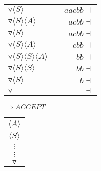 \documentclass[a4paper,12pt]{article}
\newcommand{\nonterminal}[1]{\langle #1 \rangle}
\begin{document}
\begin{tabular}{lcr}
$\triangledown \nonterminal{S}$	&	\hspace{10mm}	&	$aacbb\dashv$	\\
$\triangledown \nonterminal{S} \nonterminal{A}$	&	\hspace{10mm}	&	$acbb\dashv$	\\
$\triangledown \nonterminal{S}$	&	\hspace{10mm}	&	$acbb\dashv$	\\
$\triangledown \nonterminal{S} \nonterminal{A}$	&	\hspace{10mm}	&	$cbb\dashv$	\\
$\triangledown \nonterminal{S} \nonterminal{S}\nonterminal{A}$	&	\hspace{10mm}	&	$bb\dashv$	\\
$\triangledown \nonterminal{S} \nonterminal{S}$	&	\hspace{10mm}	&	$bb\dashv$	\\
$\triangledown \nonterminal{S}$	&	\hspace{10mm}	&	$b\dashv$	\\
$\triangledown $						&	\hspace{10mm}	&	$\dashv$	\\
\end{tabular}

$\Rightarrow ACCEPT$

\begin{tabular}{|c|}
		\\
\hline
\sout{$\nonterminal{A}$}	\\
\hline
$\nonterminal{S}$	\\
\hline
$\vdots$	\\
$\vdots$	\\
\hline
$\triangledown$	\\
\hline
\end{tabular}
\end{document}
